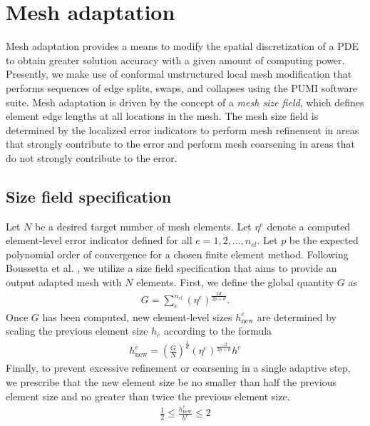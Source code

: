 \section{Mesh adaptation}

Mesh adaptation provides a means to modify the
spatial discretization of a PDE to obtain
greater solution accuracy with a given amount of
computing power. Presently, we make use of conformal
unstructured local mesh modification that performs
sequences of edge splits, swaps, and collapses
\cite{alauzet2006parallel} \cite{li20053d}
using the \textsc{PUMI} \cite{ibanez2016pumi}
software suite. Mesh adaptation is
driven by the concept of a \emph{mesh size field},
which defines element edge lengths at all locations
in the mesh. The mesh size field
is determined by the localized error indicators
to perform mesh refinement in areas that strongly
contribute to the error and perform mesh coarsening
in areas that do not strongly contribute to the error.

\subsection{Size field specification}

Let $N$ be a desired target number of mesh elements.
Let $\eta^e$ denote a computed element-level error indicator
defined for all $e=1,2,\dots,n_{el}$. Let
$p$ be the expected polynomial order of
convergence for a chosen finite element method.
Following Boussetta et al. \cite{boussetta2006adaptive},
we utilize a size field specification that aims to
provide an output adapted mesh with $N$ elements.
First, we define the global quantity $G$ as
\begin{gather}
G = \sum_{e}^{n_{el}} \left( \eta^e \right) ^{\frac{2d}{2p+d}}.
\end{gather}
%
Once $G$ has been computed, new element-level sizes
$h^e_{\text{new}}$ are determined by scaling the previous
element size $h_e$ according to the formula
\begin{gather}
h^e_{\text{new}} =
\left( \frac{G}{N} \right)^{\frac{1}{d}}
\left( \eta^e \right)^{\frac{-2}{2p + d}}
h^e
\label{eq:size}
\end{gather}
Finally, to prevent excessive refinement or coarsening
in a single adaptive step, we prescribe that the new
element size be no smaller than half the previous
element size and no greater than twice the previous
element size.
%
\begin{gather}
\frac12 \leq \frac{h^e_{\text{new}}}{h^e} \leq 2
\end{gather}
%


